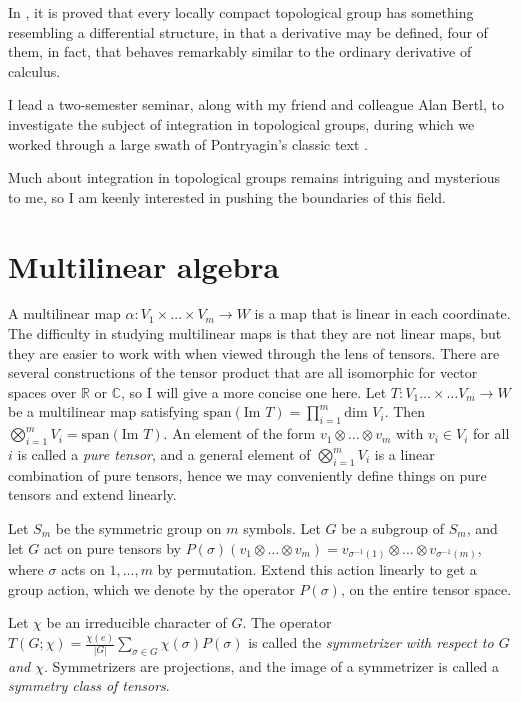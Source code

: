 \documentclass[11pt]{article}
\begin{document}
In \cite{ea96}, it is proved that every locally compact topological group
has something resembling a differential structure, in that a derivative may be
defined, four of them, in fact, that behaves remarkably similar to the ordinary
derivative of calculus. 

I lead a two-semester seminar, along with my friend and colleague Alan Bertl, to
investigate the subject of integration in topological groups, during which we
worked through a large swath of Pontryagin's classic text \cite{po86}.

Much about integration in topological groups remains intriguing and mysterious
to me, so I am keenly interested in pushing the boundaries of this field.

\section{Multilinear algebra}

A multilinear map \( \alpha: V_1 \times \dots \times V_m \to W \) is a map that
is linear in each coordinate. The difficulty in studying multilinear maps is
that they are not linear maps, but they are easier to work with when viewed
through the lens of tensors. There are several constructions of the tensor
product that are all isomorphic for vector spaces over \( \mathbb{R} \) or \(
\mathbb{C} \), so I will give a more concise one here. Let \( T: V_1 \dots
\times \dots V_m \to W \) be a multilinear map satisfying \(
\text{span}(\text{Im } T) = \prod_{i=1}^m\text{dim } V_i \). Then \(
\bigotimes_{i=1}^m V_i = \text{span}(\text{Im } T) \). An element of the form \(
v_1 \otimes \dots \otimes v_m \) with \( v_i \in V_i \) for all $i$ is called a
\emph{pure tensor}, and a general element of \( \bigotimes_{i=1}^m V_i \) is a
linear combination of pure tensors, hence we may conveniently define things on
pure tensors and extend linearly.

Let \( S_m \)
be the symmetric group on $m$ symbols. Let $G$ be a subgroup of \( S_m \),
and let $G$ act on pure tensors by
\( P(\sigma)(v_1 \otimes \dots \otimes v_m) = v_{\sigma^{-1}(1)} \otimes \dots
\otimes v_{\sigma^{-1}(m)} \),
where \( \sigma \)
acts on \( 1, \dots, m \)
by permutation. Extend this action linearly to get a group action, which we
denote by the operator \( P(\sigma) \), on the entire tensor space.

Let \( \chi \) be an irreducible character of $G$. The operator \( T(G;\chi) =
\frac{\chi(e)}{|G|}\sum_{\sigma\in G}\chi(\sigma)P(\sigma) \) is called the
\emph{symmetrizer with respect to $G$ and \( \chi \)}. Symmetrizers are
projections, and the image of a symmetrizer is called a \emph{symmetry class of
tensors}.
\end{document}
